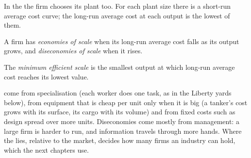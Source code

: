 In the  the firm chooses its plant too. For each plant size there is a short-run average cost curve; the long-run average cost at each output is the
lowest of them.

\begin{definition}\label{def:g11:production-and-costs:economies-of-scale}
A firm has \emph{economies of scale} when its long-run average cost falls as its output grows, and \emph{diseconomies of
scale}\label{def:g11:production-and-costs:diseconomies-of-scale} when it rises.
\end{definition}

\begin{definition}\label{def:g11:production-and-costs:mes}
The \emph{minimum efficient scale} is the smallest output at which long-run average cost reaches its lowest value.
\end{definition}

 come from specialisation (each worker does one task, as in the Liberty yards below), from equipment that is cheap per unit only when it is big
(a tanker's cost grows with its surface, its cargo with its volume) and from fixed costs such as design spread over more units. Diseconomies come mostly from
management: a large firm is harder to run, and information travels through more hands. Where the  lies, relative to the market, decides
how many firms an industry can hold, which the next chapters use.


